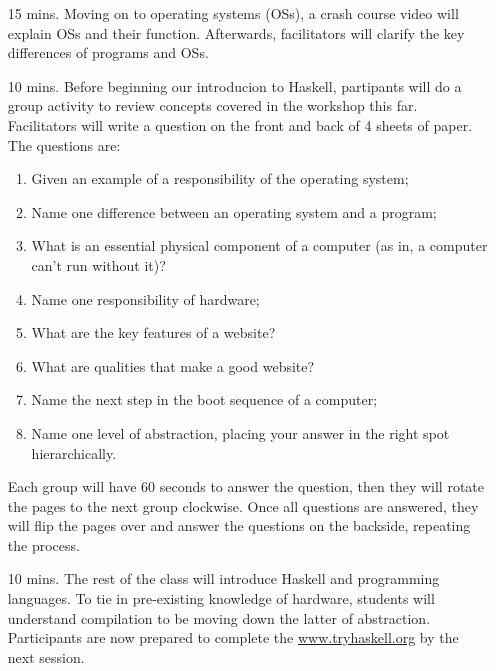 \documentclass[11pt]{article}
\begin{document}
\begin{itemize}
    \item[15 mins.] Moving on to operating systems (OSs), a crash course video
      will explain OSs and their function. Afterwards, facilitators will
      clarify the key differences of programs and OSs. 
    \item[10 mins.] Before beginning our introducion to Haskell, partipants
      will do a group activity to review concepts covered in the workshop this
      far. Facilitators will write a question on the front and back of 4 sheets
      of paper. The questions are:
      \begin{enumerate}
        \item Given an example of a responsibility of the operating system;
        \item Name one difference between an operating system and a program;
        \item What is an essential physical component of a computer (as in, a
          computer can't run without it)?
        \item Name one responsibility of hardware;
        \item What are the key features of a website?
        \item What are qualities that make a good website?
        \item Name the next step in the boot sequence of a computer;
        \item Name one level of abstraction, placing your answer in the right
          spot hierarchically.
      \end{enumerate}
      Each group will have 60 seconds to answer the question, then they will
      rotate the pages to the next group clockwise. Once all questions are
      answered, they will flip the pages over and answer the questions on the
      backside, repeating the process.
    \item[10 mins.] The rest of the class will introduce Haskell and
      programming languages. To tie in pre-existing knowledge of hardware,
      students will understand compilation to be moving down the latter of
      abstraction. Participants are now prepared to complete the
      \url{www.tryhaskell.org} by the next session.
  \end{itemize}
\end{document}
